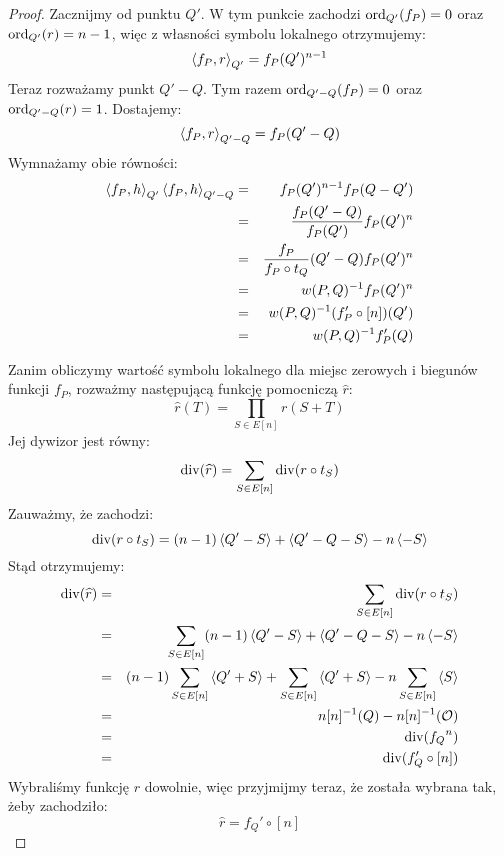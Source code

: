 \begin{proof}
Zacznijmy od punktu $Q'$. W tym punkcie zachodzi
$\operatorname{ord}_{Q'}(f_P) = 0$ oraz $\operatorname{ord}_{Q'}(r) = n-1$,
więc z własności symbolu lokalnego otrzymujemy:
\begin{equation*}
\left\langle f_P , r \right\rangle_{Q'} = f_P(Q')^{n-1}
\end{equation*}
Teraz rozważamy punkt $Q' - Q$.
Tym razem $\operatorname{ord}_{Q' - Q}(f_P) = 0$ oraz $\operatorname{ord}_{Q' - Q}(r) = 1$.
Dostajemy:
\begin{equation*}
\left\langle f_P , r \right\rangle_{Q' - Q} = f_P(Q' - Q)
\end{equation*}
Wymnażamy obie równości:
\begin{eqnarray*}
\left\langle f_P , h \right\rangle_{Q'}\left\langle f_P , h \right\rangle_{Q' - Q}
& = & f_P(Q')^{n-1} f_P(Q - Q') \\
& = & \frac{f_P(Q' - Q)}{f_P(Q')} f_P(Q')^n \\
& = & \frac{f_P}{f_P \circ t_Q}(Q' - Q) f_P(Q')^n \\
& = & w(P,Q)^{-1} f_P(Q')^n \\
& = & w(P,Q)^{-1} (f_P' \circ [n])(Q') \\
& = & w(P,Q)^{-1} f_P'(Q)
\end{eqnarray*}

Zanim obliczymy wartość symbolu lokalnego
dla miejsc zerowych i biegunów funkcji $f_P$,
rozważmy następującą funkcję pomocniczą $\widehat{r}$:
\begin{equation*}
\widehat{r}(T) = \prod_{S \in E[n]} r(S + T)
\end{equation*}
Jej dywizor jest równy:
\begin{equation*}
\operatorname{div}(\widehat{r}) = \sum_{S \in E[n]} \operatorname{div}(r \circ t_S)
\end{equation*}
Zauważmy, że zachodzi:
\begin{equation*}
\operatorname{div}(r \circ t_S) = (n-1)\left\langle Q' - S\right\rangle + \left\langle Q' - Q - S\right\rangle - n\left\langle-S\right\rangle
\end{equation*}
Stąd otrzymujemy:
\begin{eqnarray*}
\operatorname{div}(\widehat{r})
& = & \sum_{S \in E[n]} \operatorname{div}(r \circ t_S) \\
& = & \sum_{S \in E[n]} (n-1)\left\langle Q' - S\right\rangle + \left\langle Q' - Q - S\right\rangle - n\left\langle-S\right\rangle \\
& = & (n-1)\sum_{S \in E[n]}\left\langle Q' + S\right\rangle +
      \sum_{S \in E[n]}\left\langle Q' + S\right\rangle -
      n\sum_{S \in E[n]}\left\langle S\right\rangle \\
& = & n[n]^{-1}(Q) - n[n]^{-1}(\mathcal{O}) \\
& = & \operatorname{div}({f_Q}^n) \\
& = & \operatorname{div}(f_Q' \circ [n])
\end{eqnarray*}
Wybraliśmy funkcję $r$ dowolnie, więc przyjmijmy teraz,
że została wybrana tak, żeby zachodziło:
\begin{equation*}
\widehat{r} = f_Q' \circ [n]
\end{equation*}


\end{proof}
